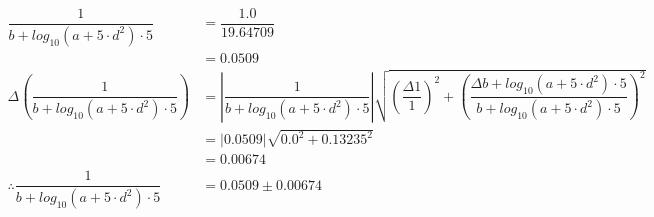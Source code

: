 \documentclass[a4paper]{article}
\begin{document}
\begin{align*}
\dfrac{ 1 }{ b + log_{ 10 }\left( a + 5 \cdot d ^ { 2 } \right) \cdot 5 } &= \dfrac{ 1.0 }{ 19.64709 } \\
&= 0.0509 \\[4mm]
\Delta \left( \dfrac{ 1 }{ b + log_{ 10 }\left( a + 5 \cdot d ^ { 2 } \right) \cdot 5 } \right) &= \left| \dfrac{ 1 }{ b + log_{ 10 }\left( a + 5 \cdot d ^ { 2 } \right) \cdot 5 } \right|\sqrt{ \left( \dfrac{ \Delta 1 }{ 1 } \right) ^ { 2 } + \left( \dfrac{ \Delta b + log_{ 10 }\left( a + 5 \cdot d ^ { 2 } \right) \cdot 5 }{ b + log_{ 10 }\left( a + 5 \cdot d ^ { 2 } \right) \cdot 5 } \right) ^ { 2 }} \\
&= \left| 0.0509 \right|\sqrt{ 0.0 ^ { 2 } + 0.13235 ^ { 2 }} \\
&= 0.00674\\[4mm]
\therefore \dfrac{ 1 }{ b + log_{ 10 }\left( a + 5 \cdot d ^ { 2 } \right) \cdot 5 } &= 0.0509 \pm 0.00674
\end{align*}
\end{document}
